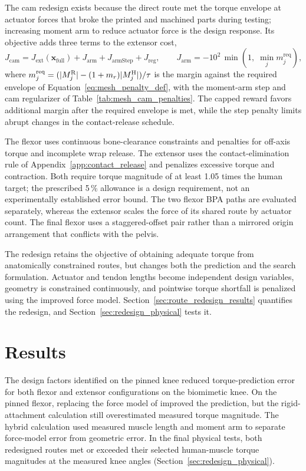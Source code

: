 The cam redesign exists because the direct route met the torque envelope at actuator forces that broke the printed and machined parts during testing; increasing moment arm to reduce actuator force is the design response. Its objective adds three terms to the extensor cost,
\begin{equation}
J_{\mathrm{cam}} = J_{\mathrm{ext}}\!\left(\mathbf{x}_{\mathrm{full}}\right) + J_{\mathrm{arm}} + J_{\mathrm{armStep}} + J_{\mathrm{reg}},
\qquad
J_{\mathrm{arm}} = -10^{2}\,\min\!\left(1,\; \min_{j} m^{\mathrm{req}}_{j}\right),
\label{eq:opt_cost_cam}
\end{equation}
where $m^{\mathrm{req}}_{j} = (\lvert M^{\mathrm{R}}_{j}\rvert - (1+m_{r})\lvert M^{\mathrm{H}}_{j}\rvert)/\tau$ is the margin against the required envelope of Equation~\eqref{eq:mesh_penalty_def}, with the moment-arm step and cam regularizer of Table~\ref{tab:mesh_cam_penalties}. The capped reward favors additional margin after the required envelope is met, while the step penalty limits abrupt changes in the contact-release schedule.

The flexor uses continuous bone-clearance constraints and penalties for off-axis torque and incomplete wrap release. The extensor uses the contact-elimination rule of Appendix~\ref{app:contact_release} and penalizes excessive torque and contraction. Both require torque magnitude of at least 1.05 times the human target; the prescribed 5\,\% allowance is a design requirement, not an experimentally established error bound. The two flexor BPA paths are evaluated separately, whereas the extensor scales the force of its shared route by actuator count. The final flexor uses a staggered-offset pair rather than a mirrored origin arrangement that conflicts with the pelvis.

The redesign retains the objective of obtaining adequate torque from anatomically constrained routes, but changes both the prediction and the search formulation. Actuator and tendon lengths become independent design variables, geometry is constrained continuously, and pointwise torque shortfall is penalized using the improved force model. Section~\ref{sec:route_redesign_results} quantifies the redesign, and Section~\ref{sec:redesign_physical} tests it.

\section{Results}\label{sec:results_torque}

\begingroup
{}
The design factors identified on the pinned knee reduced torque-prediction error for both flexor and extensor configurations on the biomimetic knee. On the pinned flexor, replacing the force model of \citet{hunt_modeling_2017} improved the prediction, but the rigid-attachment calculation still overestimated measured torque magnitude. The hybrid calculation used measured muscle length and moment arm to separate force-model error from geometric error. In the final physical tests, both redesigned routes met or exceeded their selected human-muscle torque magnitudes at the measured knee angles (Section~\ref{sec:redesign_physical}).
\par
\endgroup


